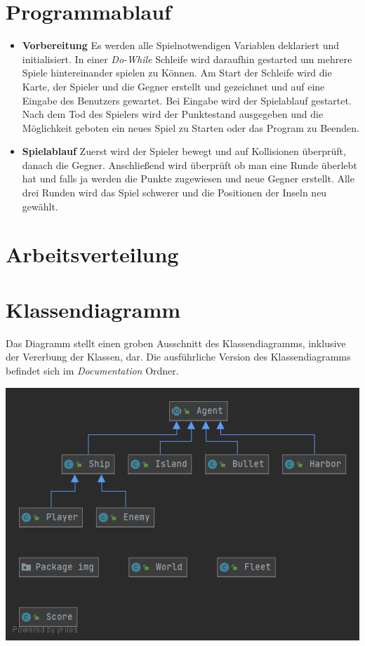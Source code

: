 \documentclass{article}
\begin{document}
\section{Programmablauf}
\begin{itemize}
    \item \textbf{Vorbereitung}
        \newline
        Es werden alle Spielnotwendigen Variablen deklariert und initialisiert. In einer \textit{Do-While} Schleife wird daraufhin gestarted um mehrere Spiele hintereinander spielen zu Können. Am Start der Schleife wird die Karte, der Spieler und die Gegner erstellt und gezeichnet und auf eine Eingabe des Benutzers gewartet. Bei Eingabe wird der Spielablauf gestartet. Nach dem Tod des Spielers wird der Punktestand ausgegeben und die Möglichkeit geboten ein neues Spiel zu Starten oder das Program zu Beenden.
    \item \textbf{Spielablauf}
        \newline
        Zuerst wird der Spieler bewegt und auf Kollisionen überprüft, danach die Gegner. Anschließend wird überprüft ob man eine Runde überlebt hat und falls ja werden die Punkte zugewiesen und neue Gegner erstellt. Alle drei Runden wird das Spiel schwerer und die Positionen der Inseln neu gewählt.
\end{itemize}
\newpage
\section{Arbeitsverteilung}

\newpage
\section{Klassendiagramm}
Das Diagramm stellt einen groben Ausschnitt des Klassendiagramms, inklusive der Vererbung der Klassen, dar. Die ausführliche Version des Klassendiagramms befindet sich im \textit{Documentation} Ordner.
\newline

\includegraphics[width=\textwidth,height=\textheight,keepaspectratio]{./images/Rough_UML.png}
\newpage
\end{document}
